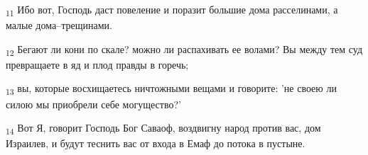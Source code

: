 \begin{tcolorbox}
\textsubscript{11} Ибо вот, Господь даст повеление и поразит большие дома расселинами, а малые дома--трещинами.
\end{tcolorbox}
\begin{tcolorbox}
\textsubscript{12} Бегают ли кони по скале? можно ли распахивать ее волами? Вы между тем суд превращаете в яд и плод правды в горечь;
\end{tcolorbox}
\begin{tcolorbox}
\textsubscript{13} вы, которые восхищаетесь ничтожными вещами и говорите: 'не своею ли силою мы приобрели себе могущество?'
\end{tcolorbox}
\begin{tcolorbox}
\textsubscript{14} Вот Я, говорит Господь Бог Саваоф, воздвигну народ против вас, дом Израилев, и будут теснить вас от входа в Емаф до потока в пустыне.
\end{tcolorbox}
